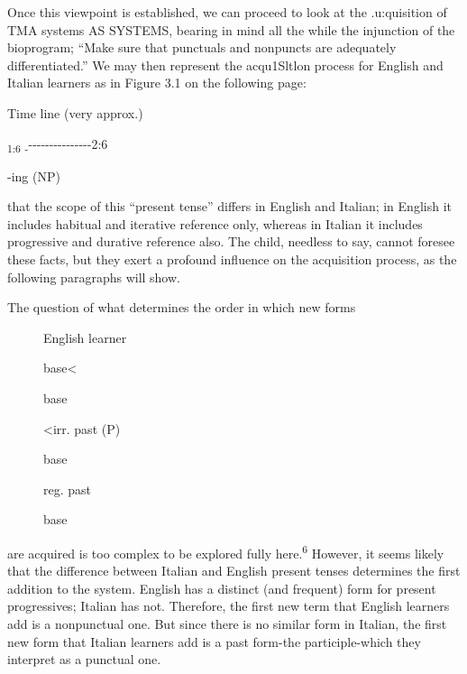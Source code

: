 Once this viewpoint is established, we can proceed to look at the .u:quisition of TMA systems AS SYSTEMS, bearing in mind all the while the injunction of the bioprogram; ``Make sure that punctuals and nonpuncts are adequately differentiated.'' We may then repre\-sent the acqu1Sltlon process for English and Italian learners as in Figure
3.1 on the following page:

Time line (very approx.)

\textsubscript{1}\textsubscript{:6 }\textsubscript{{}-}{}-{}-{}-{}-{}-{}-{}-{}-{}-{}-{}-{}-{}-{}-{}-2:6

{}-ing (NP)


that the scope of this ``present tense'' differs in English and Italian; in English it includes habitual and iterative reference only, whereas in Italian it includes progressive and durative reference also. The child,
needless to say, cannot foresee these facts, but they exert a profound influence on the acquisition process, as the following paragraphs will show.

The question of what determines the order in which new forms

\begin{figure}
English learner

base{\textless}

base

{\textless}irr. past (P)

base

reg. past

base
\end{figure}

are acquired is too complex to be explored fully here.\textsuperscript{6} However, it seems likely that the difference between Italian and English present tenses determines the first addition to the system. English has a dis\-tinct (and frequent) form for present progressives; Italian has not. Therefore, the first new term that English learners add is a nonpunctual one. But since there is no similar form in Italian, the first new form that Italian learners add is a past form-the participle-which they interpret as a punctual one.

